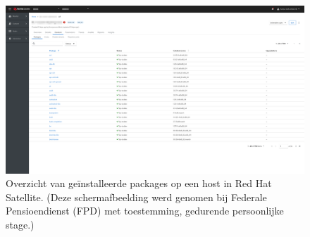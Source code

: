 \begin{figure}[h!]
    \includegraphics[width=\textwidth]
    {./graphics/state-of-the-art/rhel-satellite/rhel-sat-host-pkgs.png}
    \caption[Ge\"{i}nstalleerde packages op host in Satellite.]{\label{fig:rhel-sat-host-pkgs}Overzicht van ge\"{i}nstalleerde packages op een host in Red Hat Satellite. (Deze schermafbeelding werd genomen bij Federale Pensioendienst (FPD) met toestemming, gedurende persoonlijke stage.)}
\end{figure}
